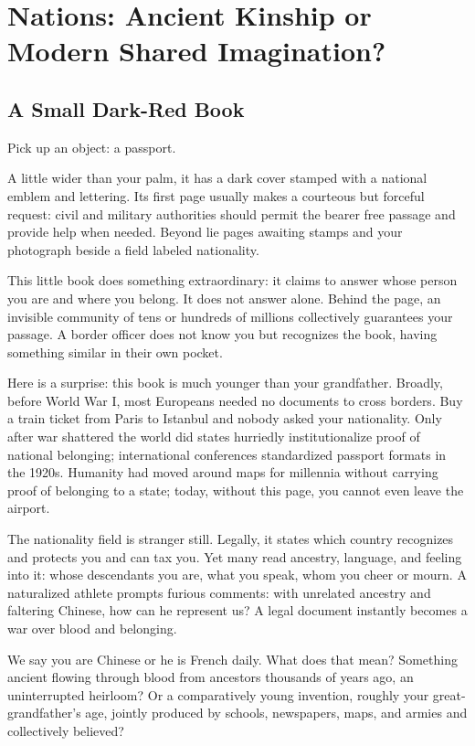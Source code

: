 \chapter[Nations: Kinship or Imagination?]{Nations: Ancient Kinship or Modern Shared Imagination?}
\section{A Small Dark-Red Book}
Pick up an object: a passport.

A little wider than your palm, it has a dark cover stamped with a national emblem and lettering. Its first page usually makes a courteous but forceful request: civil and military authorities should permit the bearer free passage and provide help when needed. Beyond lie pages awaiting stamps and your photograph beside a field labeled nationality.

This little book does something extraordinary: it claims to answer whose person you are and where you belong. It does not answer alone. Behind the page, an invisible community of tens or hundreds of millions collectively guarantees your passage. A border officer does not know you but recognizes the book, having something similar in their own pocket.

Here is a surprise: this book is much younger than your grandfather. Broadly, before World War I, most Europeans needed no documents to cross borders. Buy a train ticket from Paris to Istanbul and nobody asked your nationality. Only after war shattered the world did states hurriedly institutionalize proof of national belonging; international conferences standardized passport formats in the 1920s. Humanity had moved around maps for millennia without carrying proof of belonging to a state; today, without this page, you cannot even leave the airport.

The nationality field is stranger still. Legally, it states which country recognizes and protects you and can tax you. Yet many read ancestry, language, and feeling into it: whose descendants you are, what you speak, whom you cheer or mourn. A naturalized athlete prompts furious comments: with unrelated ancestry and faltering Chinese, how can he represent us? A legal document instantly becomes a war over blood and belonging.

We say you are Chinese or he is French daily. What does that mean? Something ancient flowing through blood from ancestors thousands of years ago, an uninterrupted heirloom? Or a comparatively young invention, roughly your great-grandfather's age, jointly produced by schools, newspapers, maps, and armies and collectively believed?

